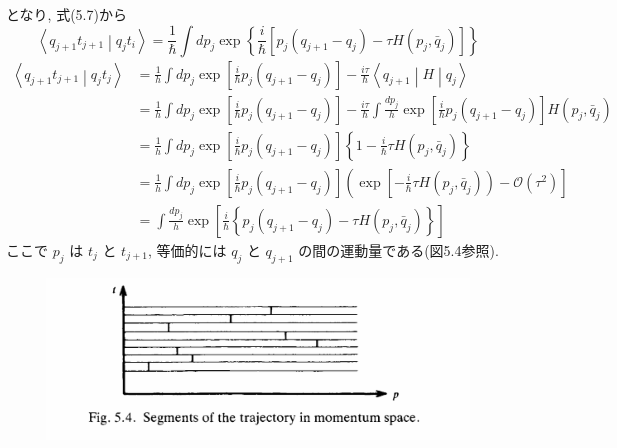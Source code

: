 \documentclass{jsarticle}
\newcommand{\braket}[2]{\left\langle #1\middle|#2\right\rangle}
\newcommand{\brakets}[3]{\left\langle #1\middle| #2 \middle|#3 \right\rangle}
\begin{document}
となり, 式(5.7)から
\begin{equation*}
    \braket{q_{j+1}t_{j+1}}{q_{j}t_{i}} = \frac{1}{\hbar}\int dp_{j} \exp\left\{ \frac{i}{\hbar}[p_{j}(q_{j+1} - q_{j}) - \tau H (p_{j}, \bar{q}_{j})] \right\} \tag{5.11}
\end{equation*}
\color{blue}
\begin{align*}
    \braket{q_{j+1}t_{j+1}}{q_{j}t_{j}} &= \frac{1}{h}\int dp_j \exp\left[ \frac{i}{\hbar}p_{j}(q_{j+1} - q_{j}) \right] - \frac{i\tau}{\hbar}\brakets{q_{j+1}}{H}{q_{j}}\\
    &= \frac{1}{h}\int dp_j \exp\left[ \frac{i}{\hbar}p_{j}(q_{j+1} - q_{j}) \right] - \frac{i\tau}{\hbar} \int \frac{dp_j}{h} \exp\left[ \frac{i}{\hbar}p_{j}(q_{j+1} - q_{j}) \right] H(p_{j}, \bar{q}_{j})\\
    &= \frac{1}{h}\int dp_j \exp\left[ \frac{i}{\hbar}p_{j}(q_{j+1} - q_{j}) \right] \left\{ 1 - \frac{i}{\hbar}\tau H(p_{j}, \bar{q}_{j}) \right\}\\
    &= \frac{1}{h}\int dp_{j} \exp\left[ \frac{i}{\hbar}p_{j}(q_{j+1} - q_{j}) \right] \left( \exp\left[ -\frac{i}{\hbar}\tau H(p_{j}, \bar{q}_{j}) \right) - \mathcal{O}(\tau^2) \right]\\
    &= \int \frac{dp_j}{h}\exp\left[ \frac{i}{\hbar}\left\{ p_j (q_{j+1} - q_j) - \tau H(p_j, \bar{q}_{j}) \right\} \right] \tag{5.11}
\end{align*}
\color{black}
ここで $p_j$ は $t_{j}$ と $t_{j+1}$, 等価的には $q_{j}$ と $q_{j+1}$ の間の運動量である(図5.4参照).

\begin{figure}[H]
    \centering
    \includegraphics[width=\textwidth]{figure/fig5-4.png}
\end{figure}
\end{document}
